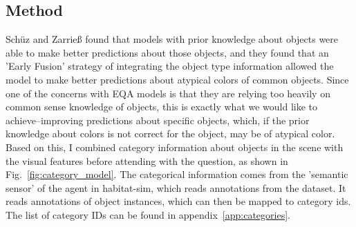 \subsection{Method}
Schüz and Zarrieß found that models with prior knowledge about objects were able to make better predictions about those objects, and they found that an 'Early Fusion' strategy of integrating the object type information allowed the model to make better predictions about atypical colors of common objects\cite{colorknowledge}. Since one of the concerns with EQA models is that they are relying too heavily on common sense knowledge of objects, this is exactly what we would like to achieve--improving predictions about specific objects, which, if the prior knowledge about colors is not correct for the object, may be of atypical color. Based on this, I combined category information about objects in the scene with the visual features before attending with the question, as shown in Fig.~\ref{fig:category_model}. The categorical information comes from the 'semantic sensor' of the agent in habitat-sim, which reads annotations from the dataset. It reads annotations of object instances, which can then be mapped to category ids. The list of category IDs can be found in appendix~\ref{app:categories}.

